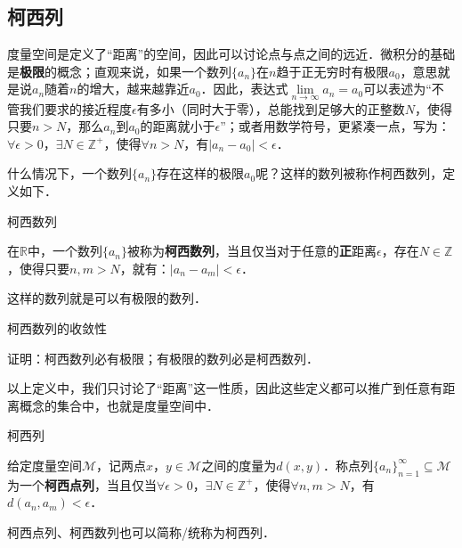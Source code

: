 

\subsection{柯西列}

度量空间是定义了“距离”的空间，因此可以讨论点与点之间的远近．微积分的基础是\textbf{极限}的概念；直观来说，如果一个数列$\{a_n\}$在$n$趋于正无穷时有极限$a_0$，意思就是说$a_n$随着$n$的增大，越来越靠近$a_0$．因此，表达式$\lim\limits_{n\rightarrow\infty}a_n=a_0$可以表述为“不管我们要求的接近程度$\epsilon$有多小（同时大于零），总能找到足够大的正整数$N$，使得只要$n>N$，那么$a_n$到$a_0$的距离就小于$\epsilon$”；或者用数学符号，更紧凑一点，写为：$\forall\epsilon>0$，$\exists N\in\mathbb{Z}^+$，使得$\forall n>N$，有$|a_n-a_0|<\epsilon$．

什么情况下，一个数列$\{a_n\}$存在这样的极限$a_0$呢？这样的数列被称作柯西数列，定义如下．

\begin{definition}{柯西数列}

在$\mathbb{R}$中，一个数列$\{a_n\}$被称为\textbf{柯西数列}，当且仅当对于任意的\textbf{正}距离$\epsilon$，存在$N\in\mathbb{Z}$，使得只要$n, m>N$，就有：$|a_n-a_m|<\epsilon$．

\end{definition}

这样的数列就是可以有极限的数列．

\begin{exercise}{柯西数列的收敛性}

证明：柯西数列必有极限；有极限的数列必是柯西数列．

\end{exercise}

以上定义中，我们只讨论了“距离”这一性质，因此这些定义都可以推广到任意有距离概念的集合中，也就是度量空间中．

\begin{definition}{柯西列}

给定度量空间$\mathcal{M}$，记两点$x$，$y\in\mathcal{M}$之间的度量为$d(x, y)$．称点列$\{a_n\}_{n=1}^{\infty}\subseteq\mathcal{M}$为一个\textbf{柯西点列}，当且仅当$\forall\epsilon>0$，$\exists N\in\mathbb{Z}^+$，使得$\forall n, m>N$，有$d(a_n, a_m)<\epsilon$．

\end{definition}


柯西点列、柯西数列也可以简称/统称为柯西列．

